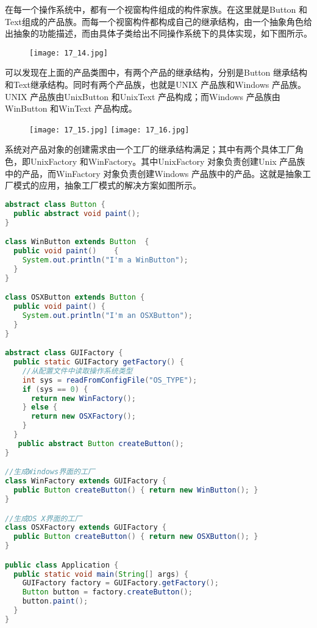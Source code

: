 \documentclass[../main.tex]{subfiles}
\begin{document}
\noindent 在每一个操作系统中，都有一个视窗构件组成的构件家族。在这里就是Button 和Text组成的产品族。而每一个视窗构件都构成自己的继承结构，由一个抽象角色给出抽象的功能描述，而由具体子类给出不同操作系统下的具体实现，如下图所示。
\begin{figure}[H]
  \texttt{[image: 17\_14.jpg]}
\end{figure}
%
可以发现在上面的产品类图中，有两个产品的继承结构，分别是Button 继承结构和Text继承结构。同时有两个产品族，也就是UNIX 产品族和Windows 产品族。UNIX 产品族由UnixButton 和UnixText 产品构成；而Windows 产品族由WinButton 和WinText 产品构成。
%
\begin{figure}[H]
  \texttt{[image: 17\_15.jpg]}
  \texttt{[image: 17\_16.jpg]}
\end{figure}
%
系统对产品对象的创建需求由一个工厂的继承结构满足；其中有两个具体工厂角色，即UnixFactory 和WinFactory。其中UnixFactory 对象负责创建Unix 产品族中的产品，而WinFactory 对象负责创建Windows 产品族中的产品。这就是抽象工厂模式的应用，抽象工厂模式的解决方案如图所示。
%
\begin{lstlisting}[language=java]
abstract class Button {
  public abstract void paint();
}

class WinButton extends Button  {
  public void paint()    {
    System.out.println("I'm a WinButton");
  }
}

class OSXButton extends Button {
  public void paint() {
    System.out.println("I'm an OSXButton");
  }
}

abstract class GUIFactory {
  public static GUIFactory getFactory() {
    //从配置文件中读取操作系统类型
    int sys = readFromConfigFile("OS_TYPE");
    if (sys == 0) {
      return new WinFactory();
    } else {
      return new OSXFactory();
    }
  }
   public abstract Button createButton();
}

//生成Windows界面的工厂
class WinFactory extends GUIFactory {
  public Button createButton() { return new WinButton(); }
}

//生成OS X界面的工厂
class OSXFactory extends GUIFactory {
  public Button createButton() { return new OSXButton(); }
}

public class Application {
  public static void main(String[] args) {
    GUIFactory factory = GUIFactory.getFactory();
    Button button = factory.createButton();
    button.paint();
  }
}
\end{lstlisting}
%
\end{document}
